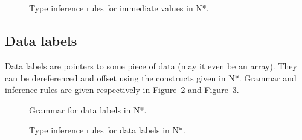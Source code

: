 \begin{figure}[H]
  \centering

  \begin{prooftree}
  \end{prooftree}
  \\\vspace{\baselineskip}
  \begin{prooftree}
  \end{prooftree}
  \\\vspace{\baselineskip}
  \begin{prooftree}
  \end{prooftree}

  \caption{Type inference rules for immediate values in N*.}
  \label{fig:nstar-common-expressions-immediate-typerules}
\end{figure}

\subsection{Data labels}\label{subsubsec:nstar-common-expressions-labels}

Data labels are pointers to some piece of data (may it even be an array).
They can be dereferenced and offset using the constructs given in N*.
Grammar and inference rules are given respectively in Figure~\ref{fig:nstar-common-expressions-labels-grammar} and Figure~\ref{fig:nstar-common-expressions-labels-typerules}.

\begin{figure}[H]
  \centering

  \caption{Grammar for data labels in N*.}
  \label{fig:nstar-common-expressions-labels-grammar}
\end{figure}

\begin{figure}[H]
  \centering

  \begin{prooftree}
  \end{prooftree}

  \caption{Type inference rules for data labels in N*.}
  \label{fig:nstar-common-expressions-labels-typerules}
\end{figure}

